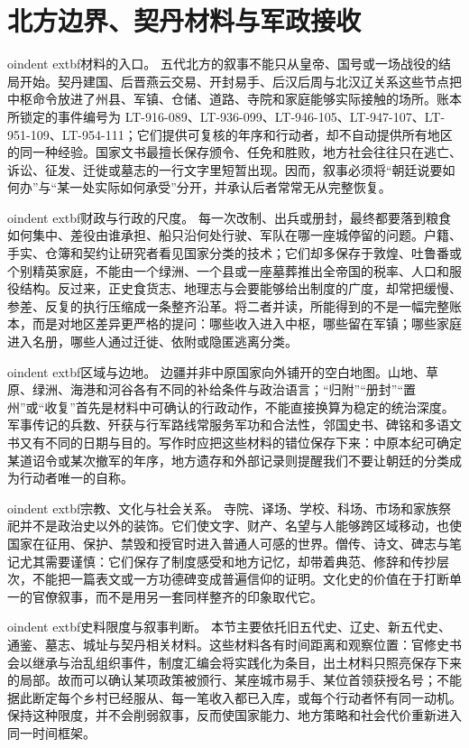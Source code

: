 \section{北方边界、契丹材料与军政接收}
\label{sec:northern-frontier-documentary-evidence}

oindent	extbf{材料的入口。} 五代北方的叙事不能只从皇帝、国号或一场战役的结局开始。契丹建国、后晋燕云交易、开封易手、后汉后周与北汉辽关系这些节点把中枢命令放进了州县、军镇、仓储、道路、寺院和家庭能够实际接触的场所。账本所锁定的事件编号为 LT-916-089、LT-936-099、LT-946-105、LT-947-107、LT-951-109、LT-954-111；它们提供可复核的年序和行动者，却不自动提供所有地区的同一种经验。国家文书最擅长保存颁令、任免和胜败，地方社会往往只在逃亡、诉讼、征发、迁徙或墓志的一行文字里短暂出现。因而，叙事必须将“朝廷说要如何办”与“某一处实际如何承受”分开，并承认后者常常无从完整恢复。


oindent	extbf{财政与行政的尺度。} 每一次改制、出兵或册封，最终都要落到粮食如何集中、差役由谁承担、船只沿何处行驶、军队在哪一座城停留的问题。户籍、手实、仓簿和契约让研究者看见国家分类的技术；它们却多保存于敦煌、吐鲁番或个别精英家庭，不能由一个绿洲、一个县或一座墓葬推出全帝国的税率、人口和服役结构。反过来，正史食货志、地理志与会要能够给出制度的广度，却常把缓慢、参差、反复的执行压缩成一条整齐沿革。将二者并读，所能得到的不是一幅完整账本，而是对地区差异更严格的提问：哪些收入进入中枢，哪些留在军镇；哪些家庭进入名册，哪些人通过迁徙、依附或隐匿逃离分类。


oindent	extbf{区域与边地。} 边疆并非中原国家向外铺开的空白地图。山地、草原、绿洲、海港和河谷各有不同的补给条件与政治语言；“归附”“册封”“置州”或“收复”首先是材料中可确认的行政动作，不能直接换算为稳定的统治深度。军事传记的兵数、歼获与行军路线常服务军功和合法性，邻国史书、碑铭和多语文书又有不同的日期与目的。写作时应把这些材料的错位保存下来：中原本纪可确定某道诏令或某次撤军的年序，地方遗存和外部记录则提醒我们不要让朝廷的分类成为行动者唯一的自称。


oindent	extbf{宗教、文化与社会关系。} 寺院、译场、学校、科场、市场和家族祭祀并不是政治史以外的装饰。它们使文字、财产、名望与人能够跨区域移动，也使国家在征用、保护、禁毁和授官时进入普通人可感的世界。僧传、诗文、碑志与笔记尤其需要谨慎：它们保存了制度感受和地方记忆，却带着典范、修辞和传抄层次，不能把一篇表文或一方功德碑变成普遍信仰的证明。文化史的价值在于打断单一的官僚叙事，而不是用另一套同样整齐的印象取代它。


oindent	extbf{史料限度与叙事判断。} 本节主要依托旧五代史、辽史、新五代史、通鉴、墓志、城址与契丹相关材料。这些材料各有时间距离和观察位置：官修史书会以继承与治乱组织事件，制度汇编会将实践化为条目，出土材料只照亮保存下来的局部。故而可以确认某项政策被颁行、某座城市易手、某位首领获授名号；不能据此断定每个乡村已经服从、每一笔收入都已入库，或每个行动者怀有同一动机。保持这种限度，并不会削弱叙事，反而使国家能力、地方策略和社会代价重新进入同一时间框架。

